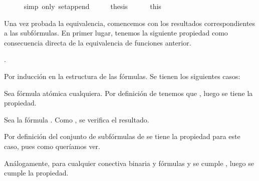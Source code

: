 \begin{isabellebody}
\ \ \ \ \isamarkupfalse%
\ {\isacharparenleft}simp\ only{\isacharcolon}\ set{\isacharunderscore}append{\isacharparenright}\isanewline
\ \ \isamarkupfalse%
\ \isamarkupfalse%
\ {\isacharquery}thesis\isanewline
\ \ \ \ \isamarkupfalse%
\ this\isanewline
{}\isamarkupfalse%
%
\endisatagproof
{\isafoldproof}%
%
\isadelimproof
%
\endisadelimproof
%
\begin{isamarkuptext}%
Una vez probada la equivalencia, comencemos con los resultados 
  correspondientes a las subfórmulas. En primer lugar, tenemos la 
  siguiente propiedad como consecuencia directa de la equivalencia de 
  funciones anterior.

  \begin{lema}
    .
  \end{lema}

  \begin{demostracion}
    Por inducción en la estructura de las fórmulas. Se tienen los
    siguientes casos:
  
    Sea  fórmula atómica cualquiera. Por definición de  tenemos 
    que , luego se tiene la propiedad.
  
    Sea la fórmula \isa{{\isasymbottom}}. Como , se verifica el resultado.

    Por definición del conjunto de subfórmulas de  se tiene 
    la propiedad para este caso, pues 
     como queríamos 
    ver.

    Análogamente, para cualquier conectiva binaria \isa{{\isacharasterisk}} y fórmulas  y 
     se cumple , luego se 
    cumple la propiedad.
  \end{demostracion}


\end{isamarkuptext}
\end{isabellebody}

